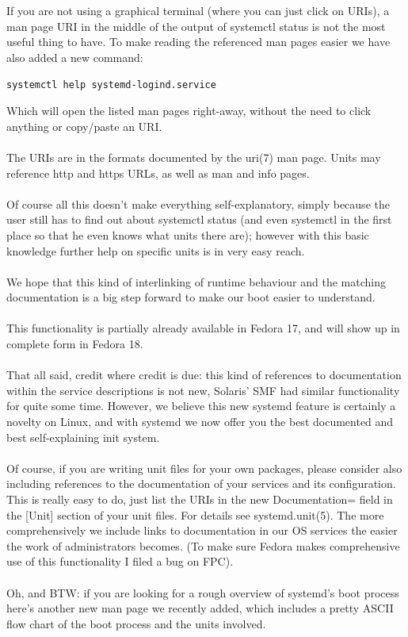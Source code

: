 \documentclass[titlepage]{article}
\begin{document}
\\
\\
If you are not using a graphical terminal (where you can just click on URIs), a man page URI in the middle of the output of systemctl status is not the most useful thing to have. To make reading the referenced man pages easier we have also added a new command:
\begin{lstlisting}
systemctl help systemd-logind.service
\end{lstlisting}
Which will open the listed man pages right-away, without the need to click anything or copy/paste an URI.
\\
\\
The URIs are in the formats documented by the uri(7) man page. Units may reference http and https URLs, as well as man and info pages.
\\
\\
Of course all this doesn't make everything self-explanatory, simply because the user still has to find out about systemctl status (and even systemctl in the first place so that he even knows what units there are); however with this basic knowledge further help on specific units is in very easy reach.
\\
\\
We hope that this kind of interlinking of runtime behaviour and the matching documentation is a big step forward to make our boot easier to understand.
\\
\\
This functionality is partially already available in Fedora 17, and will show up in complete form in Fedora 18.
\\
\\
That all said, credit where credit is due: this kind of references to documentation within the service descriptions is not new, Solaris' SMF had similar functionality for quite some time. However, we believe this new systemd feature is certainly a novelty on Linux, and with systemd we now offer you the best documented and best self-explaining init system.
\\
\\
Of course, if you are writing unit files for your own packages, please consider also including references to the documentation of your services and its configuration. This is really easy to do, just list the URIs in the new Documentation= field in the [Unit] section of your unit files. For details see systemd.unit(5). The more comprehensively we include links to documentation in our OS services the easier the work of administrators becomes. (To make sure Fedora makes comprehensive use of this functionality I filed a bug on FPC).
\\
\\
Oh, and BTW: if you are looking for a rough overview of systemd's boot process here's another new man page we recently added, which includes a pretty ASCII flow chart of the boot process and the units involved.
\end{document}
